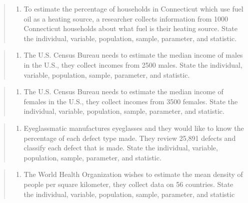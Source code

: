 \documentclass[]{book}
\providecommand{\tightlist}{%
  \setlength{\itemsep}{0pt}\setlength{\parskip}{0pt}}
\begin{document}
\begin{quote}
\begin{enumerate}
\def\labelenumi{\arabic{enumi}.}
\setcounter{enumi}{3}
\tightlist
\item
  To estimate the percentage of households in Connecticut which use fuel oil as a heating source, a researcher collects information from 1000 Connecticut households about what fuel is their heating source. State the individual, variable, population, sample, parameter, and statistic.
\end{enumerate}
\end{quote}

\begin{quote}
\begin{enumerate}
\def\labelenumi{\arabic{enumi}.}
\setcounter{enumi}{4}
\tightlist
\item
  The U.S. Census Bureau needs to estimate the median income of males in the U.S., they collect incomes from 2500 males. State the individual, variable, population, sample, parameter, and statistic.
\end{enumerate}
\end{quote}

\begin{quote}
\begin{enumerate}
\def\labelenumi{\arabic{enumi}.}
\setcounter{enumi}{5}
\tightlist
\item
  The U.S. Census Bureau needs to estimate the median income of females in the U.S., they collect incomes from 3500 females. State the individual, variable, population, sample, parameter, and statistic.
\end{enumerate}
\end{quote}

\begin{quote}
\begin{enumerate}
\def\labelenumi{\arabic{enumi}.}
\setcounter{enumi}{6}
\tightlist
\item
  Eyeglassmatic manufactures eyeglasses and they would like to know the percentage of each defect type made. They review 25,891 defects and classify each defect that is made. State the individual, variable, population, sample, parameter, and statistic.
\end{enumerate}
\end{quote}

\begin{quote}
\begin{enumerate}
\def\labelenumi{\arabic{enumi}.}
\setcounter{enumi}{7}
\tightlist
\item
  The World Health Organization wishes to estimate the mean density of people per square kilometer, they collect data on 56 countries. State the individual, variable, population, sample, parameter, and statistic
\end{enumerate}
\end{quote}
\end{document}
